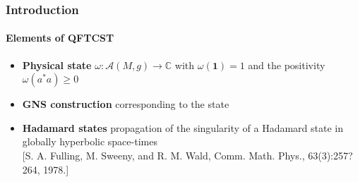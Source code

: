 \documentclass[french]{beamer}
\begin{document}
\begin{frame}
\frametitle{Introduction}
\framesubtitle{Elements of QFTCST}
\begin{itemize}

\item \textbf{Physical state} $\omega: \mathscr{A}(M,g) \rightarrow \mathbb{C}$ with $\omega(\mathbf{1}) = 1$ and the positivity $\omega(a^*a) \geq 0$

\item \textbf{GNS construction} corresponding to the state 

\item \textbf{Hadamard states} propagation of the singularity of a Hadamard state in globally hyperbolic space-times
\\
\tiny{\color{blue}[S. A. Fulling, M. Sweeny, and R. M. Wald, Comm. Math. Phys., 63(3):257?264, 1978.]}\color{black}\normalsize








\end{itemize}

\end{frame}


\end{document}
